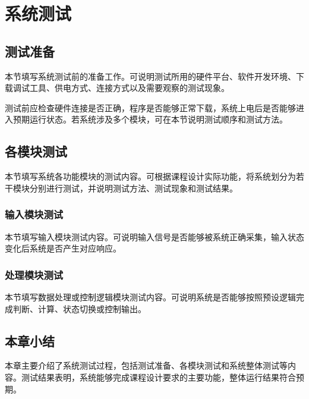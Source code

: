 \chapter{系统测试}

\section{测试准备}

本节填写系统测试前的准备工作。可说明测试所用的硬件平台、软件开发环境、下载调试工具、供电方式、连接方式以及需要观察的测试现象。

测试前应检查硬件连接是否正确，程序是否能够正常下载，系统上电后是否能够进入预期运行状态。若系统涉及多个模块，可在本节说明测试顺序和测试方法。

\section{各模块测试}

本节填写系统各功能模块的测试内容。可根据课程设计实际功能，将系统划分为若干模块分别进行测试，并说明测试方法、测试现象和测试结果。

\subsection{输入模块测试}

本节填写输入模块测试内容。可说明输入信号是否能够被系统正确采集，输入状态变化后系统是否产生对应响应。

\subsection{处理模块测试}

本节填写数据处理或控制逻辑模块测试内容。可说明系统是否能够按照预设逻辑完成判断、计算、状态切换或控制输出。



\section{本章小结}

本章主要介绍了系统测试过程，包括测试准备、各模块测试和系统整体测试等内容。测试结果表明，系统能够完成课程设计要求的主要功能，整体运行结果符合预期。